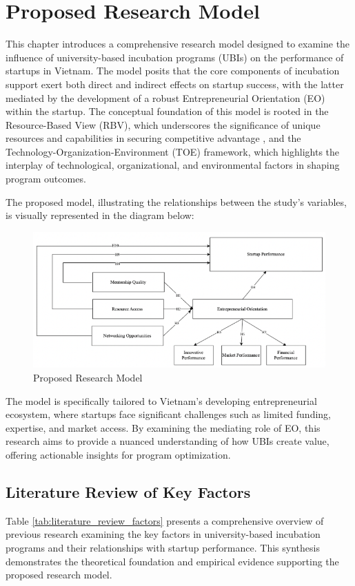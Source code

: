 \documentclass[../Main.tex]{subfiles}
\begin{document}
	\section{Proposed Research Model}
    This chapter introduces a comprehensive research model designed to examine the influence of university-based incubation programs (UBIs) on the performance of startups in Vietnam. The model posits that the core components of incubation support exert both direct and indirect effects on startup success, with the latter mediated by the development of a robust Entrepreneurial Orientation (EO) within the startup. The conceptual foundation of this model is rooted in the Resource-Based View (RBV), which underscores the significance of unique resources and capabilities in securing competitive advantage \autocite{barney1991firm}, and the Technology-Organization-Environment (TOE) framework, which highlights the interplay of technological, organizational, and environmental factors in shaping program outcomes.

    The proposed model, illustrating the relationships between the study's variables, is visually represented in the diagram below:
    \begin{figure}[H]
        \centering
        \includegraphics[width=\textwidth]{Figure/research_model.png}
        \caption{Proposed Research Model}
        \label{fig:research_model}
    \end{figure}

    The model is specifically tailored to Vietnam's developing entrepreneurial ecosystem, where startups face significant challenges such as limited funding, expertise, and market access. By examining the mediating role of EO, this research aims to provide a nuanced understanding of how UBIs create value, offering actionable insights for program optimization.

    \subsection{Literature Review of Key Factors}
    Table \ref{tab:literature_review_factors} presents a comprehensive overview of previous research examining the key factors in university-based incubation programs and their relationships with startup performance. This synthesis demonstrates the theoretical foundation and empirical evidence supporting the proposed research model.
\end{document}

